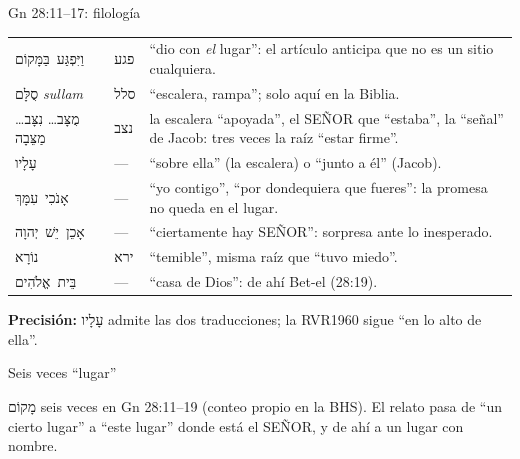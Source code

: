 \documentclass[hyperref={bookmarks=false},aspectratio=169]{beamer}
\newcommand{\heb}[1]{\mbox{\foreignlanguage{hebrew}{#1}}}
\newcommand{\SENOR}{S{\fontsize{0.78em}{1em}\selectfont EÑOR}}
\newcommand{\precision}[1]{{\footnotesize\color{gris}\textbf{Precisión:} #1}}
\begin{document}
\begin{frame}{Gn 28:11--17: filología}
\scriptsize\renewcommand{\arraystretch}{1.08}
\begin{tabular}{@{}>{\RaggedRight\arraybackslash}p{3.0cm}>{\RaggedRight\arraybackslash}p{0.8cm}>{\RaggedRight\arraybackslash}p{8.0cm}@{}}
\toprule
\heb{וַיִּפְגַּע בַּמָּקוֹם} & \heb{פגע} & ``dio con \emph{el} lugar'': el artículo anticipa que no es un sitio cualquiera. \\
\heb{סֻלָּם} \emph{sullam} & \heb{סלל} & ``escalera, rampa''; solo aquí en la Biblia. \\
\heb{מֻצָּב}\ldots{} \heb{נִצָּב}\ldots{} \heb{מַצֵּבָה} & \heb{נצב} & la escalera ``apoyada'', el \SENOR{} que ``estaba'', la ``señal'' de Jacob: tres veces la raíz ``estar firme''. \\
\heb{עָלָיו} & --- & ``sobre ella'' (la escalera) o ``junto a él'' (Jacob). \\
\heb{אָנֹכִי עִמָּךְ} & --- & ``yo contigo'', ``por dondequiera que fueres'': la promesa no queda en el lugar. \\
\heb{אָכֵן יֵשׁ יְהוָה} & --- & ``ciertamente hay \SENOR{}'': sorpresa ante lo inesperado. \\
\heb{נוֹרָא} & \heb{ירא} & ``temible'', misma raíz que ``tuvo miedo''. \\
\heb{בֵּית אֱלֹהִים} & --- & ``casa de Dios'': de ahí Bet-el (28:19). \\
\bottomrule
\end{tabular}\par\smallskip
\precision{\heb{עָלָיו} admite las dos traducciones; la RVR1960 sigue ``en lo alto de ella''.}
\end{frame}

\begin{frame}{Seis veces ``lugar''}
\centering
{}\par\medskip
\small\RaggedRight \heb{מָקוֹם} seis veces en Gn 28:11--19 (conteo propio en la BHS). El relato pasa de ``un cierto lugar'' a ``este lugar'' donde está el \SENOR{}, y de ahí a un lugar con nombre.
\end{frame}
\end{document}
